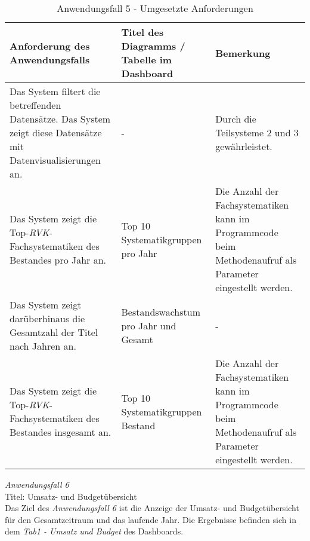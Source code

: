 \begingroup
    \setlength{\tabcolsep}{12pt} %
    \renewcommand{\arraystretch}{1.5} 
    \begin{table}[H]
        \centering
        \begin{adjustbox}{max width=\textwidth}
        \begin{tabular}{p{}p{}p{}}
           \toprule
           Anforderung des Anwendungsfalls        &Titel des Diagramms / Tabelle im Dashboard &Bemerkung\\
           \midrule
           Das System filtert die betreffenden Datensätze. Das System zeigt diese Datensätze mit Datenvisualisierungen an.&-&Durch die Teilsysteme 2 und 3 gewährleistet.\\
           Das System zeigt die Top-\textit{\acrshort{RVK}}-Fachsystematiken des Bestandes pro Jahr an.&Top 10 Systematikgruppen pro Jahr&Die Anzahl der Fachsystematiken kann im Programmcode beim Methodenaufruf als Parameter eingestellt werden.\\
           Das System zeigt darüberhinaus die Gesamtzahl der Titel nach Jahren an.&Bestandswachstum pro Jahr und Gesamt&-\\
           Das System zeigt die Top-\textit{\acrshort{RVK}}-Fachsystematiken des Bestandes insgesamt an.&Top 10 Systematikgruppen Bestand&Die Anzahl der Fachsystematiken kann im Programmcode beim Methodenaufruf als Parameter eingestellt werden.\\
        \bottomrule
        \end{tabular}
        \end{adjustbox}
        \caption{%
            Anwendungsfall 5 - Umgesetzte Anforderungen
        }
        \label{tab:Anwendungsfall 5 - Umgesetzte Anforderungen}
        \end{table}

\clearpage
\noindent
\textit{Anwendungsfall 6}\\
Titel: Umsatz- und Budgetübersicht\\
Das Ziel des \textit{Anwendungsfall 6} ist die Anzeige der Umsatz- und Budgetübersicht für den Gesamtzeitraum und das laufende Jahr.
Die Ergebnisse befinden sich in dem \textit{Tab1 - Umsatz und Budget} des Dashboards.


